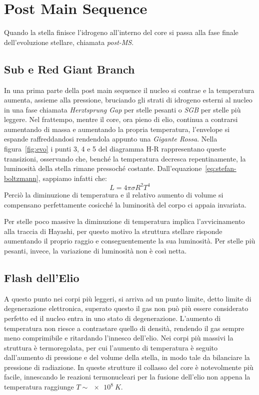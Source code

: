 \section{Post Main Sequence}\label{sec:post-main-sequence}
Quando la stella finisce l'idrogeno all'interno del core si passa alla fase finale dell'evoluzione stellare, chiamata \textit{post-MS}. 

\subsection{Sub e Red Giant Branch}\label{sec:SGB-RGB}
In una prima parte della post main sequence il nucleo si contrae e la temperatura aumenta, assieme alla pressione, bruciando gli strati di idrogeno esterni al nucleo in una fase chiamata \textit{Herztsprung Gap} per stelle pesanti o \textit{SGB} per stelle più leggere. Nel frattempo, mentre il core, ora pieno di elio, continua a contrarsi aumentando di massa e aumentando la propria temperatura, l'envelope si espande raffreddandosi rendendola appunto una \textit{Gigante Rossa}. Nella figura~\ref{fig:evo} i punti 3, 4 e 5 del diagramma H-R rappresentano queste transizioni, osservando che, benché la temperatura decresca repentinamente, la luminosità della stella rimane pressoché costante. Dall'equazione~\ref{eq:stefan-boltzmann}, sappiamo infatti che:
\[
    L = 4\pi \sigma R^2 T^4
\]
Perciò la diminuzione di temperatura e il relativo aumento di volume si compensano perfettamente cosicché la luminosità del corpo ci appaia invariata.

Per stelle poco massive la diminuzione di temperatura implica l'avvicinamento alla traccia di Hayashi, per questo motivo la struttura stellare risponde aumentando il proprio raggio e conseguentemente la sua luminosità. Per stelle più pesanti, invece, la variazione di luminosità non è così netta. 
\subsection{Flash dell'Elio}\label{sec:flash-He e Horizontal Branch}

A questo punto nei corpi più leggeri, si arriva ad un punto limite, detto limite di degenerazione elettronica, superato questo il gas non può più essere considerato perfetto ed il nucleo entra in uno stato di degenerazione. L'aumento di temperatura non riesce a contrastare quello di densità, rendendo il gas sempre meno comprimibile e ritardando l'innesco dell'elio. Nei corpi più massivi la struttura è termoregolata, per cui l'aumento di temperatura è seguito dall'aumento di pressione e del volume della stella, in modo tale da bilanciare la pressione di radiazione. In queste strutture il collasso del core è notevolmente più facile, innescando le reazioni termonucleari per la fusione dell'elio non appena la temperatura raggiunge $T \sim \SI{e8}{K}$.

